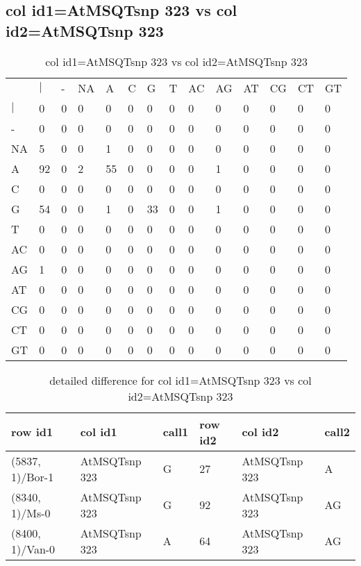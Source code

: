 \subsection{col id1=AtMSQTsnp 323 vs col id2=AtMSQTsnp 323}
\begin{center}
\begin{longtable}{|l|l|l|l|l|l|l|l|l|l|l|l|l|l|}
\caption{col id1=AtMSQTsnp 323 vs col id2=AtMSQTsnp 323} \label{table_dm664}\\
\hline
\\
\hline
&$|$&-&NA&A&C&G&T&AC&AG&AT&CG&CT&GT\\
$|$&0&0&0&0&0&0&0&0&0&0&0&0&0\\
-&0&0&0&0&0&0&0&0&0&0&0&0&0\\
NA&5&0&0&1&0&0&0&0&0&0&0&0&0\\
A&92&0&2&55&0&0&0&0&1&0&0&0&0\\
C&0&0&0&0&0&0&0&0&0&0&0&0&0\\
G&54&0&0&1&0&33&0&0&1&0&0&0&0\\
T&0&0&0&0&0&0&0&0&0&0&0&0&0\\
AC&0&0&0&0&0&0&0&0&0&0&0&0&0\\
AG&1&0&0&0&0&0&0&0&0&0&0&0&0\\
AT&0&0&0&0&0&0&0&0&0&0&0&0&0\\
CG&0&0&0&0&0&0&0&0&0&0&0&0&0\\
CT&0&0&0&0&0&0&0&0&0&0&0&0&0\\
GT&0&0&0&0&0&0&0&0&0&0&0&0&0\\
\hline
\end{longtable}
\end{center}

\begin{center}
\begin{longtable}{|l|l|l|l|l|l|}
\caption{detailed difference for col id1=AtMSQTsnp 323 vs col id2=AtMSQTsnp 323} \label{table_dm665}\\
\hline
row id1&col id1&call1&row id2&col id2&call2\\
\hline
(5837, 1)/Bor-1&AtMSQTsnp 323&G&27&AtMSQTsnp 323&A\\
(8340, 1)/Ms-0&AtMSQTsnp 323&G&92&AtMSQTsnp 323&AG\\
(8400, 1)/Van-0&AtMSQTsnp 323&A&64&AtMSQTsnp 323&AG\\
\hline
\end{longtable}
\end{center}

